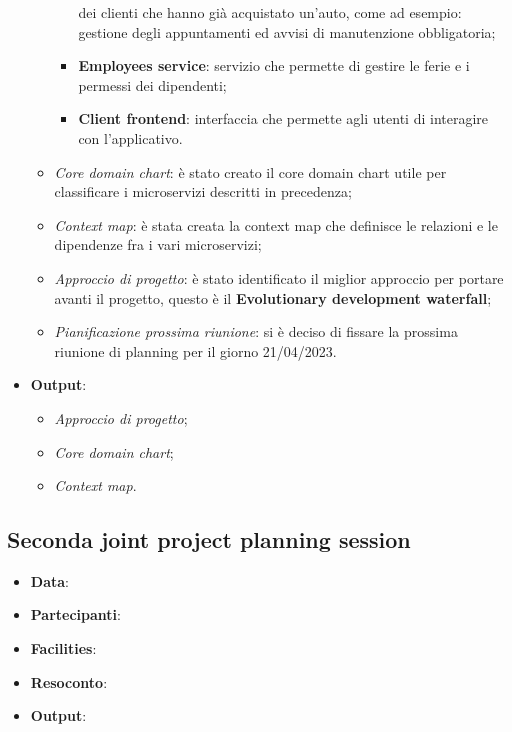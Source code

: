 \documentclass{article}
\begin{document}
\begin{itemize}
\begin{itemize}
\begin{itemize}
            dei clienti che hanno già acquistato un’auto, come ad esempio: 
            gestione degli appuntamenti ed avvisi di manutenzione obbligatoria;
          \item \textbf{Employees service}: servizio che permette di gestire le 
            ferie e i permessi dei dipendenti;
          \item \textbf{Client frontend}: interfaccia che permette agli utenti 
            di interagire con l’applicativo.
        \end{itemize}
        \item \emph{Core domain chart}: è stato creato il core domain chart utile per classificare i microservizi 
          descritti in precedenza;
        \item \emph{Context map}: è stata creata la context map che definisce le relazioni e le dipendenze fra i 
          vari microservizi;
        \item \emph{Approccio di progetto}: è stato identificato il miglior approccio per portare avanti il
          progetto, questo è il \textbf{Evolutionary development waterfall};
        \item \emph{Pianificazione prossima riunione}: si è deciso di fissare la prossima riunione di planning
          per il giorno 21/04/2023.
    \end{itemize}
    \item \textbf{Output}:
    \begin{itemize}
      \item \emph{Approccio di progetto};
      \item \emph{Core domain chart};
      \item \emph{Context map}.
    \end{itemize}
  \end{itemize}

  \subsection{Seconda joint project planning session}
  \begin{itemize}
    \item \textbf{Data}:
    \item \textbf{Partecipanti}:
    \item \textbf{Facilities}:
    \item \textbf{Resoconto}:
    \item \textbf{Output}: 
  \end{itemize}
\end{document}
